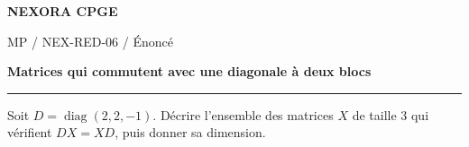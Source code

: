 \documentclass[11pt,a4paper]{article}
\begin{document}
{\small\bfseries\color{nexorablue} NEXORA CPGE}\par
{\small MP / NEX-RED-06 / Énoncé}\par
{\LARGE\bfseries Matrices qui commutent avec une diagonale à deux blocs}\par
\vspace{0.25em}\hrule\vspace{0.6em}

Soit $D=\operatorname{diag}(2,2,-1)$. Décrire l’ensemble des matrices $X$ de taille $3$ qui vérifient $DX=XD$, puis donner sa dimension.
\end{document}

